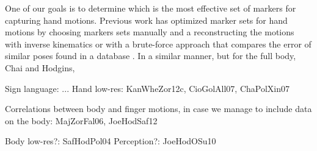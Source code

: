 One of our goals is to determine which is the most effective set of markers for capturing hand motions. Previous work has optimized marker sets for hand motions by choosing markers sets manually and a reconstructing the motions with inverse kinematics \cite{HoyRyaOSu11} or with a brute-force approach that compares the error of similar poses found in a database \cite{KanWheZor13}. 
In a similar manner, but for the full body, Chai and Hodgins, 


Sign language: ...
Hand low-res: KanWheZor12c, CioGolAll07, ChaPolXin07

Correlations between body and finger motions, in case we manage to include data on the body: MajZorFal06, JoeHodSaf12

Body low-res?: SafHodPol04
Perception?: JoeHodOSu10
